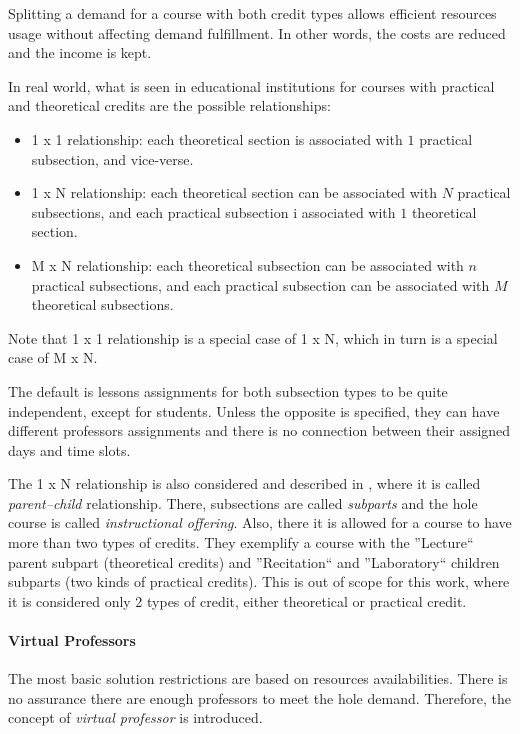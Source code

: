 Splitting a demand for a course with both credit types allows efficient resources usage without affecting demand fulfillment. In other words, the costs are reduced and the income is kept.

In real world, what is seen in educational institutions for courses with practical and theoretical credits are the possible relationships:
\begin{itemize}
\item 1 x 1 relationship: each theoretical section is associated with $1$ practical subsection, and vice-verse.
\item 1 x N relationship: each theoretical section can be associated with $N$ practical subsections, and each practical subsection i associated with $1$ theoretical section.
\item M x N relationship: each theoretical subsection can be associated with $n$ practical subsections, and each practical subsection can be associated with $M$ theoretical subsections.
\end{itemize}

Note that 1 x 1 relationship is a special case of 1 x N, which in turn is a special case of M x N.

The default is lessons assignments for both subsection types to be quite independent, except for students. Unless the opposite is specified, they can have different professors assignments and there is no connection between their assigned days and time slots.

The 1 x N relationship is also considered and described in \cite{Murray2007}, where it is called \textit{parent--child} relationship. There, subsections are called \textit{subparts} and the hole course is called \textit{instructional offering}. Also, there it is allowed for a course to have more than two types of credits. They exemplify a course with the ''Lecture`` parent subpart (theoretical credits) and ''Recitation`` and ''Laboratory`` children subparts (two kinds of practical credits). This is out of scope for this work, where it is considered only 2 types of credit, either theoretical or practical credit.


\paragraph{Virtual Professors}
\label{constrvirtprof}

The most basic solution restrictions are based on resources availabilities. There is no assurance there are enough professors to meet the hole demand. Therefore, the concept of \textit{virtual professor} is introduced.

